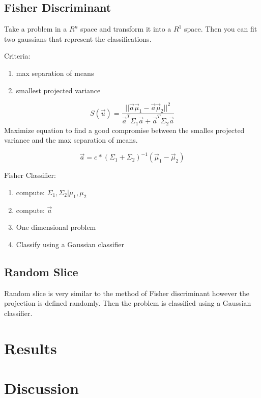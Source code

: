\documentclass[letterpaper]{article}
\begin{document}
\subsection{Fisher Discriminant}
Take a problem in a $R^n$ space and transform it into a $R^1$ space. Then you can fit two gaussians that represent the classifications.

Criteria:
\begin{enumerate}
\item max separation of means
\item smallest projected variance
\end{enumerate}

\begin{equation}
S(\vec{u}) = \frac{||\vec{a} \vec{\mu}_1 - \vec{a} \vec{\mu}_2||^2}{\vec{a}^T \Sigma_1 \vec{a} + \vec{a}^T \Sigma_2 \vec{a}}
\end{equation}
Maximize equation to find a good compromise between the smalles projected variance and the max separation of means.

\begin{equation}
\vec{a} = c * (\Sigma_1 + \Sigma_2)^{-1} (\vec{\mu}_1 - \vec{\mu}_2)
\end{equation}

Fisher Classifier:
\begin{enumerate}
\item compute: $\Sigma_1, \Sigma_2 | \mu_1, \mu_2$
\item compute: $\vec{a}$
\item One dimensional problem
\item Classify using a Gaussian classifier
\end{enumerate}

\subsection{Random Slice}
Random slice is very similar to the method of Fisher discriminant however the projection is defined randomly. Then the problem is classified using a Gaussian classifier.

\section{Results}

\section{Discussion}
\end{document}
